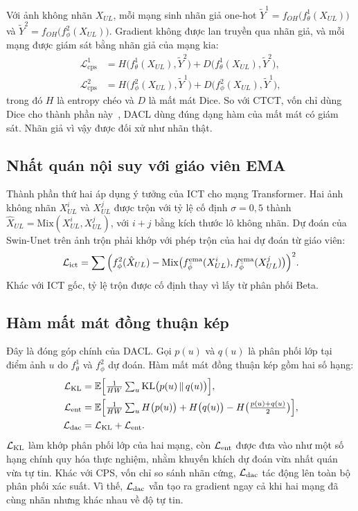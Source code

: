 Với ảnh không nhãn $X_{UL}$, mỗi mạng sinh nhãn giả one-hot $\tilde Y^1=f_{OH}\big(f^1_\theta(X_{UL})\big)$ và $\tilde Y^2=f_{OH}\big(f^2_\phi(X_{UL})\big)$. Gradient không được lan truyền qua nhãn giả, và mỗi mạng được giám sát bằng nhãn giả của mạng kia:
\begin{align}
  \mathcal{L}^1_{\mathrm{cps}} &= H\big(f^1_\theta(X_{UL}),\tilde Y^2\big) + D\big(f^1_\theta(X_{UL}),\tilde Y^2\big),\label{eq:cps1}\\
  \mathcal{L}^2_{\mathrm{cps}} &= H\big(f^2_\phi(X_{UL}),\tilde Y^1\big) + D\big(f^2_\phi(X_{UL}),\tilde Y^1\big),\label{eq:cps2}
\end{align}
trong đó $H$ là entropy chéo và $D$ là mất mát Dice. So với CTCT, vốn chỉ dùng Dice cho thành phần này~\cite{luo2022ctct}, DACL dùng đúng dạng hàm của mất mát có giám sát. Nhãn giả vì vậy được đối xử như nhãn thật.

\subsection{Nhất quán nội suy với giáo viên EMA}

Thành phần thứ hai áp dụng ý tưởng của ICT cho mạng Transformer. Hai ảnh không nhãn $X^i_{UL}$ và $X^j_{UL}$ được trộn với tỷ lệ cố định $\sigma=0{,}5$ thành $\hat X_{UL}=\mathrm{Mix}(X^i_{UL},X^j_{UL})$, với $i+j$ bằng kích thước lô không nhãn. Dự đoán của Swin-Unet trên ảnh trộn phải khớp với phép trộn của hai dự đoán từ giáo viên:
\begin{equation}
  \mathcal{L}_{\mathrm{ict}}=\sum\Big(f^2_\phi(\hat X_{UL})-\mathrm{Mix}\big(f^{\mathrm{ema}}_{\bar\phi}(X^i_{UL}),f^{\mathrm{ema}}_{\bar\phi}(X^j_{UL})\big)\Big)^2 .
  \label{eq:ict}
\end{equation}
Khác với ICT gốc, tỷ lệ trộn được cố định thay vì lấy từ phân phối Beta.

\subsection{Hàm mất mát đồng thuận kép}

Đây là đóng góp chính của DACL. Gọi $p(u)$ và $q(u)$ là phân phối lớp tại điểm ảnh $u$ do $f^1_\theta$ và $f^2_\phi$ dự đoán. Hàm mất mát đồng thuận kép gồm hai số hạng:
\begin{align}
  \mathcal{L}_{\mathrm{KL}}  &= \mathbb{E}\Big[\tfrac{1}{HW}\textstyle\sum_u \mathrm{KL}\big(p(u)\,\|\,q(u)\big)\Big],\\
  \mathcal{L}_{\mathrm{ent}} &= \mathbb{E}\Big[\tfrac{1}{HW}\textstyle\sum_u
           H\big(p(u)\big)+H\big(q(u)\big)-H\big(\tfrac{p(u)+q(u)}{2}\big)\Big],\label{eq:lent}\\
  \mathcal{L}_{\mathrm{dac}} &= \mathcal{L}_{\mathrm{KL}} + \mathcal{L}_{\mathrm{ent}} .
\end{align}
$\mathcal{L}_{\mathrm{KL}}$ làm khớp phân phối lớp của hai mạng, còn $\mathcal{L}_{\mathrm{ent}}$ được đưa vào như một số hạng chính quy hóa thực nghiệm, nhằm khuyến khích dự đoán vừa nhất quán vừa tự tin. Khác với CPS, vốn chỉ so sánh nhãn cứng, $\mathcal{L}_{\mathrm{dac}}$ tác động lên toàn bộ phân phối xác suất. Vì thế, $\mathcal{L}_{\mathrm{dac}}$ vẫn tạo ra gradient ngay cả khi hai mạng đã cùng nhãn nhưng khác nhau về độ tự tin.

